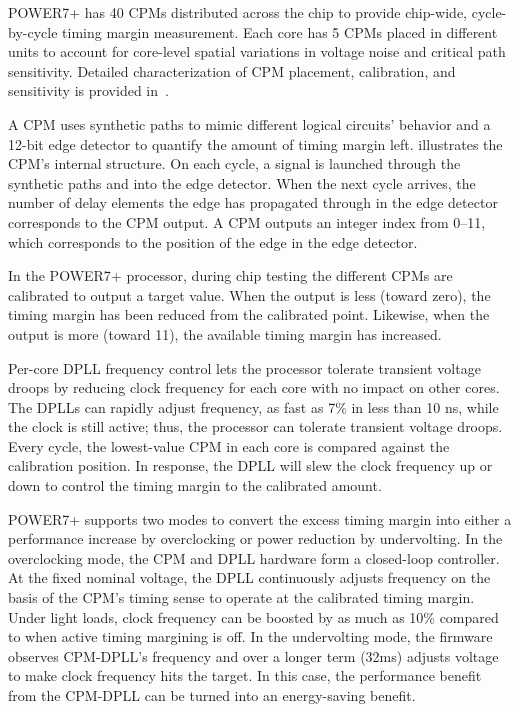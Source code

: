 POWER7+ has 40 CPMs distributed across the chip to provide chip-wide, cycle-by-cycle timing margin measurement. Each core has 5 CPMs placed in different units to account for core-level spatial variations in voltage noise and critical path sensitivity. Detailed characterization of CPM placement, calibration, and sensitivity is provided in~\cite{floyd2013runtime}.

A CPM uses synthetic paths to mimic different logical circuits' behavior and a 12-bit edge detector to quantify the amount of timing margin left.  illustrates the CPM's internal structure. On each cycle, a signal is launched through the synthetic paths and into the edge detector. When the next cycle arrives, the number of delay elements the edge has propagated through in the edge detector corresponds to the CPM output. A CPM outputs an integer index from 0--11, which corresponds to the position of the edge in the edge detector.

In the POWER7+ processor, during chip testing the different CPMs are calibrated to output a target value.  When the output is less (toward zero), the timing margin has been reduced from the calibrated point. Likewise, when the output is more (toward 11), the available timing margin has increased.

Per-core DPLL frequency control lets the processor tolerate transient voltage droops by reducing clock frequency for each core with no impact on other cores. The DPLLs can rapidly adjust frequency, as fast as 7\% in less than 10 ns, while the clock is still active; thus, the processor can tolerate transient voltage droops. Every cycle, the lowest-value CPM in each core is compared against the calibration position. In response, the DPLL will slew the clock frequency up or down to control the timing margin to the calibrated amount. 

POWER7+ supports two modes to convert the excess timing margin into either a performance increase by overclocking or power reduction by undervolting. In the overclocking mode, the CPM and DPLL hardware form a closed-loop controller. At the fixed nominal voltage, the DPLL continuously adjusts frequency on the basis of the CPM's timing sense to operate at the calibrated timing margin. Under light loads, clock frequency can be boosted by as much as 10\% compared to when active timing margining is off. In the undervolting mode, the firmware observes CPM-DPLL's frequency and over a longer term (32ms) adjusts voltage to make clock frequency hits the target. In this case, the performance benefit from the CPM-DPLL can be turned into an energy-saving benefit.

